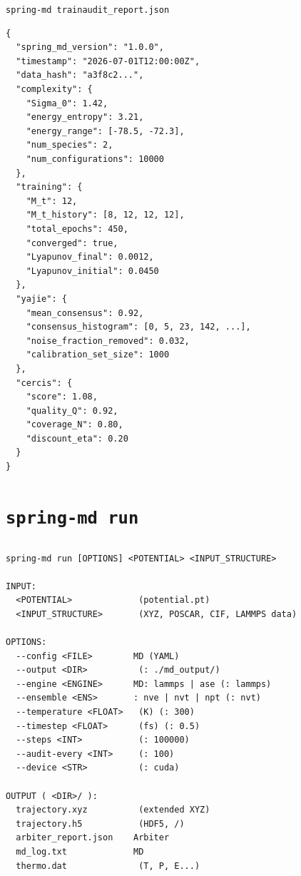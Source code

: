 \documentclass[12pt,a4paper]{article}
\theoremstyle{remark}
\begin{document}
\texttt{spring-md train}\texttt{audit\_report.json}

\begin{lstlisting}[caption={\texttt{audit\_report.json} },label=lst:audit_json]
{
  "spring_md_version": "1.0.0",
  "timestamp": "2026-07-01T12:00:00Z",
  "data_hash": "a3f8c2...",
  "complexity": {
    "Sigma_0": 1.42,
    "energy_entropy": 3.21,
    "energy_range": [-78.5, -72.3],
    "num_species": 2,
    "num_configurations": 10000
  },
  "training": {
    "M_t": 12,
    "M_t_history": [8, 12, 12, 12],
    "total_epochs": 450,
    "converged": true,
    "Lyapunov_final": 0.0012,
    "Lyapunov_initial": 0.0450
  },
  "yajie": {
    "mean_consensus": 0.92,
    "consensus_histogram": [0, 5, 23, 142, ...],
    "noise_fraction_removed": 0.032,
    "calibration_set_size": 1000
  },
  "cercis": {
    "score": 1.08,
    "quality_Q": 0.92,
    "coverage_N": 0.80,
    "discount_eta": 0.20
  }
}
\end{lstlisting}

\newpage

\section{\texttt{spring-md run}}

\subsection{}

\begin{lstlisting}[caption={\texttt{spring-md run} },label=lst:run]
spring-md run [OPTIONS] <POTENTIAL> <INPUT_STRUCTURE>

INPUT:
  <POTENTIAL>             (potential.pt)
  <INPUT_STRUCTURE>       (XYZ, POSCAR, CIF, LAMMPS data)

OPTIONS:
  --config <FILE>        MD (YAML)
  --output <DIR>          (: ./md_output/)
  --engine <ENGINE>      MD: lammps | ase (: lammps)
  --ensemble <ENS>       : nve | nvt | npt (: nvt)
  --temperature <FLOAT>   (K) (: 300)
  --timestep <FLOAT>      (fs) (: 0.5)
  --steps <INT>           (: 100000)
  --audit-every <INT>     (: 100)
  --device <STR>          (: cuda)

OUTPUT ( <DIR>/ ):
  trajectory.xyz          (extended XYZ)
  trajectory.h5           (HDF5, /)
  arbiter_report.json    Arbiter
  md_log.txt             MD
  thermo.dat              (T, P, E...)
\end{lstlisting}
\end{document}
